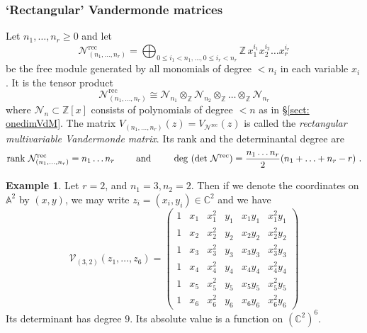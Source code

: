 \documentclass[a4paper,10pt]{amsart}
\theoremstyle{definition}
\newtheorem{example}[thm]{Example}
\theoremstyle{remark}
\numberwithin{equation}{section}
\newcommand{\Z}{\mathbb Z}
\newcommand{\C}{\mathbb C}
\newcommand{\rank}{\mathrm{rank}}
\newcommand{\0}{\color{blue}{\mathsf{0}}}
\begin{document}
  \subsubsection{`Rectangular' Vandermonde matrices}  \label{sect: rectVdM}  Let $n_1,\ldots, n_r\geq 0$ and let
  \[ \mathcal{N}^{\mathrm{rec}}_{(n_1,\ldots, n_r)} =  \bigoplus_{0 \leq i_1 < n_1,  \ldots, 0\leq  i_r < n_r}  \Z\,   x_1^{i_1} x_2^{i_2} \ldots x_r^{i_r} \]
  be the free module generated by all monomials of degree $< n_i$ in each variable $x_i$. 
    It is the tensor product 
    \begin{equation}
    \mathcal{N}^{\mathrm{rec}}_{(n_1,\ldots, n_r)}  \cong     \mathcal{N}_{n_1} \otimes_{\Z}    \mathcal{N}_{n_2} \otimes_{\Z}
    \ldots    \otimes_{\Z}     \mathcal{N}_{n_r}  
    \end{equation} 
    where $ \mathcal{N}_{n} \subset \Z[x]$ consists of polynomials of degree $<n$  as in \S\ref{sect: onedimVdM}.   The  matrix $V_{(n_1,\ldots, n_r)} (z) = V_{\mathcal{N}^{\mathrm{rec}}}(z)$ is called the \emph{rectangular multivariable Vandermonde matrix}.
  Its rank and the  determinantal degree are
  \begin{equation} \label{degree :rectangularcase}
  \rank \, \,\mathcal{N}^{\mathrm{rec}}_{(n_1,\ldots, n_r)} =  n_1\ldots n_r\qquad \hbox{ and } \qquad 
   \deg\,   \left(\det\,   \mathcal{N}^{\mathrm{rec}}\right) =  \frac{n_1 \ldots n_r}{2} (n_1+ \ldots + n_r- r)   \ . 
  \end{equation} 
\begin{example} Let $r=2$, and $n_1=3, n_2=2$. Then if we denote the coordinates on $\mathbb{A}^2$ by $(x,y)$, we may write $z_i = (x_i, y_i) \in \C^2$ and we have
\[ \mathcal{V}_{(3,2)}(z_1,\ldots, z_6) =  \begin{pmatrix}  1 & x_1 &x_1^2 &  y_1 & x_1y_1 & x_1^2 y_1  \\
1 & x_2 &x_2^2 &  y_2 & x_2y_2 & x_2^2 y_2\\
1 & x_3 &x_3^2 &  y_3 & x_3y_3 & x_3^2 y_3\\
1 & x_4 &x_4^2 &  y_4 & x_4y_4 & x_4^2 y_4\\
1 & x_5 &x_5^2 &  y_5 & x_5y_5 & x_5^2 y_5\\
1 & x_6 &x_6^2 &  y_6 & x_6y_6 & x_6^2 y_6
\end{pmatrix}
\]
Its determinant has degree $9$. 
Its  absolute value   is a function on $(\C^2)^6$.
\end{example}
\end{document}
